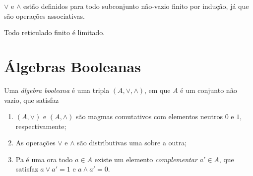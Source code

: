 $\vee$ e $\wedge$ estão definidos para todo subconjunto não-vazio finito por indução, já que são operações associativas.

\begin{prop}
Todo reticulado finito é limitado.
\end{prop}

\section{Álgebras Booleanas}
\begin{defi}
Uma \emph{álgebra booleana} é uma tripla $(A, \vee ,\wedge)$, em que $A$ é um conjunto não vazio, que satisfaz
	\begin{enumerate}
	\item $(A,\vee)$ e $(A,\wedge)$ são magmas comutativos com elementos neutros $0$ e $1$, respectivamente;
	\item As operações $ \vee $ e $\wedge$ são distributivas uma sobre a outra;
	\item Pa é uma ora todo $a \in A$ existe um elemento \emph{complementar} $a' \in A$, que satisfaz $a \vee a'=1$ e $a \wedge a' = 0$.
	\end{enumerate}
\end{defi}

